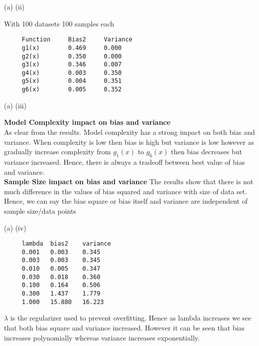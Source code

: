 \documentclass[12pt]{article}
\newenvironment{problem}[2][Problem]{\begin{trivlist}
\item[\hskip \labelsep {\bfseries #1}\hskip \labelsep {\bfseries #2.}]}{\end{trivlist}}
\begin{document}
\begin{problem} 6 (a) (ii)
\end{problem}
\begin{Answer}
With 100 datasets 100 samples each
\begin{verbatim}
     Function     Bias2     Variance
     g1(x)        0.469     0.000
     g2(x)        0.350     0.000
     g3(x)        0.346     0.007
     g4(x)        0.003     0.350
     g5(x)        0.004     0.351
     g6(x)        0.005     0.352
\end{verbatim}
\end{Answer}

\begin{problem} 6 (a) (iii)
\end{problem}
\begin{Answer}
\textbf{Model Complexity impact on bias and variance}\\
As clear from the results. Model complexity has a strong impact on both bias and variance. When complexity is low then bias is high but variance is low however as gradually increase complexity from $g_{1}(x)$ to $g_{6}(x)$ then bias decreases but variance increased. Hence, there is always a tradeoff between best value of bias and variance. \\

\textbf{Sample Size impact on bias and variance }
The results show that there is not much difference in the values of bias squared and variance with size of data set. Hence, we can say the bias square or bias itself and variance are independent of sample size/data points
\end{Answer}

\begin{problem} 6 (a) (iv)
\end{problem}
\begin{Answer}
\begin{verbatim}
     lambda  bias2    variance
     0.001   0.003    0.345
     0.003   0.003    0.345
     0.010   0.005    0.347
     0.030   0.018    0.360
     0.100   0.164    0.506
     0.300   1.437    1.779
     1.000   15.880   16.223
\end{verbatim}
$\lambda$ is the regularizer used to prevent overfitting. Hence as lambda increases we see that both bias square and variance increased. However it can be seen that bias increases polynomially whereas variance increases exponentially.
\end{Answer}
\end{document}
